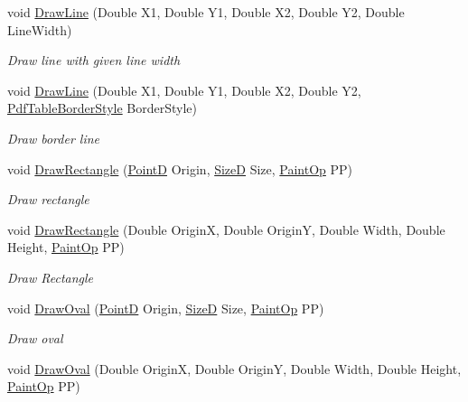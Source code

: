 \begin{DoxyCompactItemize}
void \hyperlink{class_pdf_file_writer_1_1_pdf_contents_acf9c42ee2acd18c13d3f203ca31cb894}{Draw\+Line} (Double X1, Double Y1, Double X2, Double Y2, Double Line\+Width)
\begin{DoxyCompactList}\small\item\em Draw line with given line width \end{DoxyCompactList}\item 
void \hyperlink{class_pdf_file_writer_1_1_pdf_contents_aa2de80a075fbb207a6f28f6e13e79c6d}{Draw\+Line} (Double X1, Double Y1, Double X2, Double Y2, \hyperlink{class_pdf_file_writer_1_1_pdf_table_border_style}{Pdf\+Table\+Border\+Style} Border\+Style)
\begin{DoxyCompactList}\small\item\em Draw border line \end{DoxyCompactList}\item 
void \hyperlink{class_pdf_file_writer_1_1_pdf_contents_ad111bfc33b3dcbf91dc2d02bc4dc395b}{Draw\+Rectangle} (\hyperlink{class_pdf_file_writer_1_1_point_d}{PointD} Origin, \hyperlink{class_pdf_file_writer_1_1_size_d}{SizeD} Size, \hyperlink{namespace_pdf_file_writer_a1bd0bc3fdabed20e2459496f1bbe2101}{Paint\+Op} PP)
\begin{DoxyCompactList}\small\item\em Draw rectangle \end{DoxyCompactList}\item 
void \hyperlink{class_pdf_file_writer_1_1_pdf_contents_ad7e169bebc02542dcc9067e3ab33e388}{Draw\+Rectangle} (Double OriginX, Double OriginY, Double Width, Double Height, \hyperlink{namespace_pdf_file_writer_a1bd0bc3fdabed20e2459496f1bbe2101}{Paint\+Op} PP)
\begin{DoxyCompactList}\small\item\em Draw Rectangle \end{DoxyCompactList}\item 
void \hyperlink{class_pdf_file_writer_1_1_pdf_contents_ae5cf9d30fc58999cebd895472a0acd39}{Draw\+Oval} (\hyperlink{class_pdf_file_writer_1_1_point_d}{PointD} Origin, \hyperlink{class_pdf_file_writer_1_1_size_d}{SizeD} Size, \hyperlink{namespace_pdf_file_writer_a1bd0bc3fdabed20e2459496f1bbe2101}{Paint\+Op} PP)
\begin{DoxyCompactList}\small\item\em Draw oval \end{DoxyCompactList}\item 
void \hyperlink{class_pdf_file_writer_1_1_pdf_contents_a93b8105a97581efe4670be4de9af6f7c}{Draw\+Oval} (Double OriginX, Double OriginY, Double Width, Double Height, \hyperlink{namespace_pdf_file_writer_a1bd0bc3fdabed20e2459496f1bbe2101}{Paint\+Op} PP)

\end{DoxyCompactItemize}
